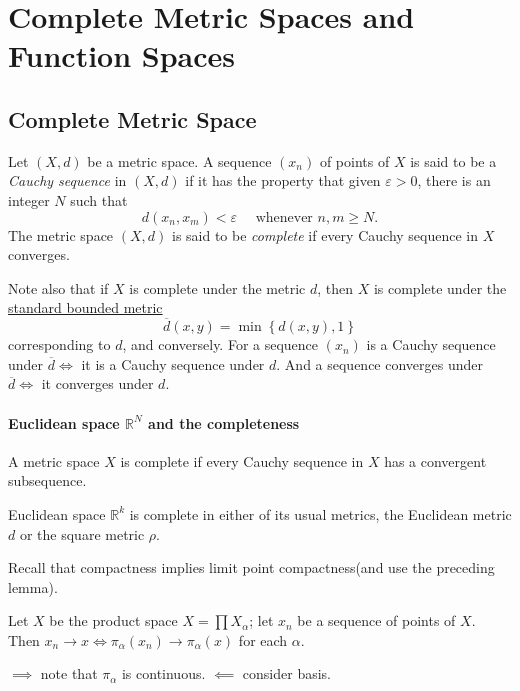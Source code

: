 \section{Complete Metric Spaces and Function Spaces}

\subsection{Complete Metric Space}

\begin{definition}
  Let \( (X, d) \) be a metric space.
  A sequence \( (x_n) \) of points of \( X \) is said to be a \emph{Cauchy sequence} in \( (X, d) \) if it has the property that given \( \varepsilon > 0 \), there is an integer \( N \) such that
  \[
    d(x_n, x_m) < \varepsilon \quad \text{ whenever } n, m \geq N.
  \]
  The metric space \( (X, d) \) is said to be \emph{complete} if every Cauchy sequence in \( X \) converges.
\end{definition}

Note also that if \( X \) is complete under the metric \( d \), then \( X \) is complete under the \underline{standard bounded metric}
\[
  \overline{d}(x, y) =\min \left\lbrace d(x, y), 1 \right\rbrace
\]
corresponding to \( d \), and conversely.
For a sequence \( (x_n) \) is a Cauchy sequence under \( \overline{d} \iff \) it is a Cauchy sequence under \( d \).
And a sequence converges under \( \overline{d} \iff \) it converges under \( d \).

\paragraph{Euclidean space \( \mathbb{R}^N \) and the completeness}

\begin{lemma}
  A metric space \( X \) is complete if every Cauchy sequence in \( X \) has a convergent subsequence.
\end{lemma}

\begin{theorem}
  Euclidean space \( \mathbb{R}^k \) is complete in either of its usual metrics, the Euclidean metric \( d \) or the square metric \( \rho \).
\end{theorem}
\begin{sketchproof}
  Recall that compactness implies limit point compactness(and use the preceding lemma).
\end{sketchproof}

\begin{lemma}
  Let \( X \) be the product space \( X = \prod X_\alpha \);
  let \( x_n \) be a sequence of points of \( X \).
  Then \( x_n \to x \iff \pi_\alpha(x_n) \to \pi_\alpha(x) \) for each \( \alpha \).
\end{lemma}
\begin{sketchproof}
  \( \implies \) note that \( \pi_\alpha \) is continuous.
  \( \impliedby \) consider basis.
\end{sketchproof}


